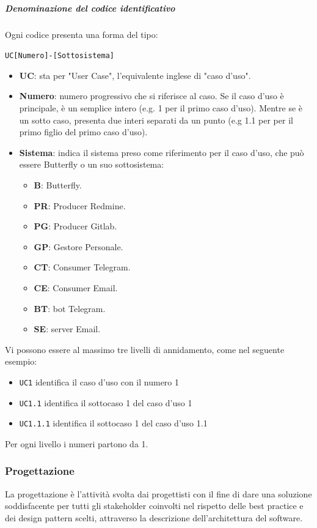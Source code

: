 		\subparagraph{Denominazione del codice identificativo}
		Ogni codice presenta una forma del tipo:
		\begin{center}
			\texttt{UC[Numero]-[Sottosistema]}
		\end{center}
	
		\begin{itemize}
			\item \textbf{UC}: sta per "User Case", l'equivalente inglese di "caso d'uso".
			\item \textbf{Numero}: numero progressivo che si riferisce al caso. Se il caso d'uso è principale, è un semplice intero (e.g. 1 per il primo caso d'uso). Mentre se è un sotto caso, presenta due interi separati da un punto (e.g 1.1 per per il primo figlio del primo caso d'uso).
			\item \textbf{Sistema}: indica il sistema preso come riferimento per il caso d'uso, che può essere Butterfly o un suo sottosistema:
			\begin{itemize}
				\item \textbf{B}: Butterfly.
				\item \textbf{PR}: Producer Redmine.
				\item \textbf{PG}: Producer Gitlab.
				\item \textbf{GP}: Gestore Personale.
				\item \textbf{CT}: Consumer Telegram.
				\item \textbf{CE}: Consumer Email.
				\item \textbf{BT}: bot Telegram.
				\item \textbf{SE}: server Email.
			\end{itemize}
		\end{itemize}

		Vi possono essere al massimo tre livelli di annidamento, come nel seguente esempio:
		\begin{itemize}
			\item \texttt{UC1} identifica il caso d'uso con il numero 1
			\item \texttt{UC1.1} identifica il sottocaso 1 del caso d'uso 1
			\item \texttt{UC1.1.1} identifica il sottocaso 1 del caso d'uso 1.1
		\end{itemize}
		Per ogni livello i numeri partono da 1.

        \subsubsection{Progettazione}\label{PP:Sviluppo:Progettazione}
        La progettazione è l'attività svolta dai progettisti con il fine di dare una soluzione soddisfacente per tutti gli stakeholder coinvolti nel rispetto delle best practice e dei design pattern scelti, attraverso la descrizione dell'architettura del software.

